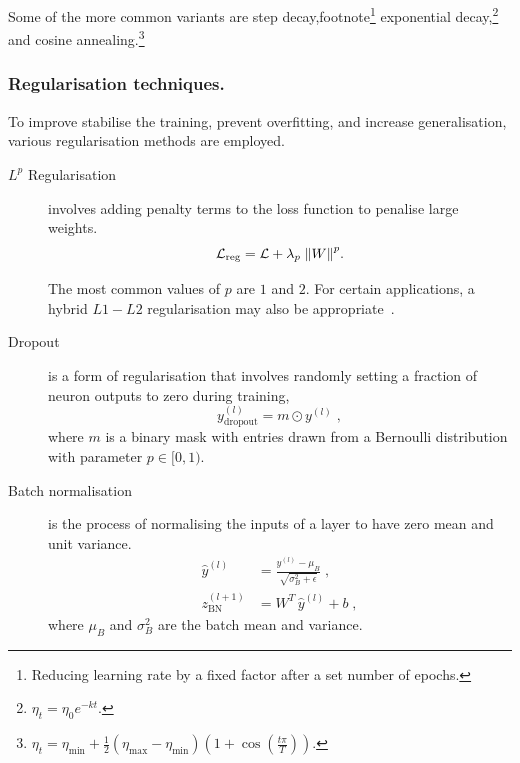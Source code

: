                 Some of the more common variants are step decay,footnote\footnote{Reducing learning rate by a fixed factor after a set number of epochs.} exponential decay,\footnote{\(\eta_t = \eta_0 e^{-kt}.\)} and cosine annealing.\footnote{\(\eta_t = \eta_{\min} + \frac{1}{2}(\eta_{\max} - \eta_{\min})(1 + \cos(\frac{t\pi}{T}))\).}

            
        \subsubsection{Regularisation techniques.}
        \label{subsubsec:regularisation-techniques}
            To improve stabilise the training, prevent overfitting, and increase generalisation, various regularisation methods are employed.

            \begin{description}
            \item[\(L^p\) Regularisation] involves adding penalty terms to the loss function to penalise large weights.
                \begin{equation}
                    \mathcal{L}_{\textrm{reg}} = \mathcal{L} + \lambda_p\;\norm{W}^p.
                \end{equation}
                
                The most common values of $p$ are $1$ and $2.$
                For certain applications, a hybrid $L1-L2$ regularisation may also be appropriate~\cite{shah_inverse_2016}.
                
            \item[Dropout] is a form of regularisation that involves randomly setting a fraction of neuron outputs to zero during training,
               \begin{equation}
                    y^{(l)}_{\text{dropout}} = m \odot y^{(l)}\;,
               \end{equation}
               where \(m\) is a binary mask with entries drawn from a Bernoulli distribution with parameter $p\in [0, 1)$.

            \item[Batch normalisation] is the process of normalising the inputs of a layer to have zero mean and unit variance.
                   \begin{align}
                        \hat{y}^{(l)} &= \frac{y^{(l)} - \mu_B}{\sqrt{\sigma_B^2 + \epsilon}}\;, \\
                        z_{\text{BN}}^{(l+1)} &= W^T \,\hat{y}^{(l)} + b\;,
                   \end{align}
                   where \(\mu_B\) and \(\sigma_B^2\) are the batch mean and variance.
    \end{description}

